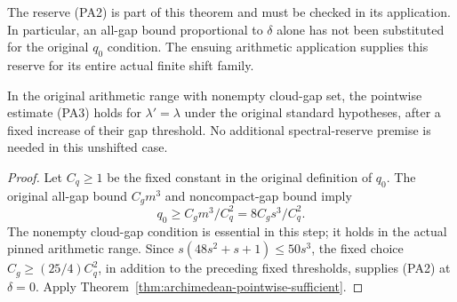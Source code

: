 The reserve (PA2) is part of this theorem and must be checked in
its application. In particular, an all-gap bound proportional
to \(\delta\) alone has not been substituted for the original
\(q_0\) condition. The ensuing arithmetic application supplies
this reserve for its entire actual finite shift family.

\begin{corollary}
\label{cor:archimedean-unshifted-pointwise}
In the original arithmetic range with nonempty cloud-gap set,
the pointwise estimate (PA3) holds for \(\lambda'=\lambda\)
under the original standard hypotheses, after a fixed increase
of their gap threshold. No additional spectral-reserve premise
is needed in this unshifted case.
\end{corollary}
\begin{proof}
Let \(C_q\ge1\) be the fixed constant in the original definition
of \(q_0\). The original all-gap bound \(C_gm^3\) and
noncompact-gap bound imply
\[
 q_0\ge C_gm^3/C_q^2=8C_gs^3/C_q^2.
\]
The nonempty cloud-gap condition is essential in this step;
it holds in the actual pinned arithmetic range.
Since \(s(48s^2+s+1)\le50s^3\), the fixed choice
\(C_g\ge(25/4)C_q^2\), in addition to the preceding fixed
thresholds, supplies (PA2) at \(\delta=0\).
Apply Theorem~\ref{thm:archimedean-pointwise-sufficient}.
\end{proof}
